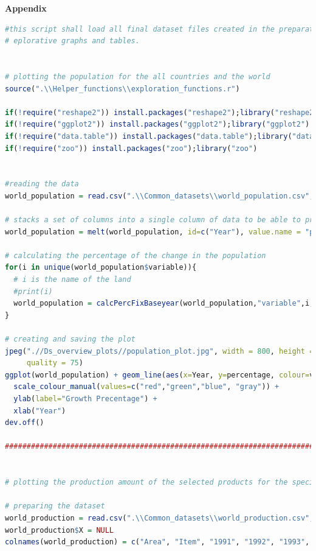 \documentclass[11pt]{article}
\begin{document}
\textbf{Appendix} \hfill \break
\hfill \break
\begin{lstlisting}[language= R]
#this script shall load all final dataset files created in the preparation stage and include the code for displaying 
# eplorative graphs and tables.


# plotting the population for the all countries and the world
source(".\\Helper_functions\\exploration_functions.r")

if(!require("reshape2")) install.packages("reshape2");library("reshape2")
if(!require("ggplot2")) install.packages("ggplot2");library("ggplot2")
if(!require("data.table")) install.packages("data.table");library("data.table")
if(!require("zoo")) install.packages("zoo");library("zoo")


#reading the data  
world_population = read.csv(".\\Common_datasets\\world_population.csv", stringsAsFactors = FALSE, sep = ",", header = TRUE)

# stacks a set of columns into a single column of data to be able to process it 
world_population = melt(world_population, id=c("Year"), value.name = "population")

# calculating the percentage of the change in the population
for(i in unique(world_population$variable)){
  # i is the name of the land 
  #print(i)
  world_population = calcPercFixBaseyear(world_population,"variable",i,"Year",1991,"population", "percentage")
}

# creating and saving the plot
jpeg(".//Ds_overview_plots//population_plot.jpg", width = 800, height = 480, units = "px", pointsize = 12,
     quality = 75)
ggplot(world_population) + geom_line(aes(x=Year, y=percentage, colour=variable), size=1.2) +
  scale_colour_manual(values=c("red","green","blue", "gray")) +
  ylab(label="Growth Precentage") +
  xlab("Year") 
dev.off()

############################################################################################################


# plotting the production amount of the selected products for the specified countries compared to the world

# preparing the dataset 
world_production = read.csv(".\\Common_datasets\\world_production.csv", stringsAsFactors = FALSE, sep = ",", header = TRUE)
world_production$X = NULL
colnames(world_production) = c("Area", "Item", "1991", "1992", "1993", "1994", "1995", "1996", "1997", "1998", "1999", "2000", "2001", "2002", "2003", "2004", "2005", "2006", "2007", "2008", "2009", "2010", "2011", "2012", "2013", "2014", "2015")


\end{lstlisting}
\end{document}

